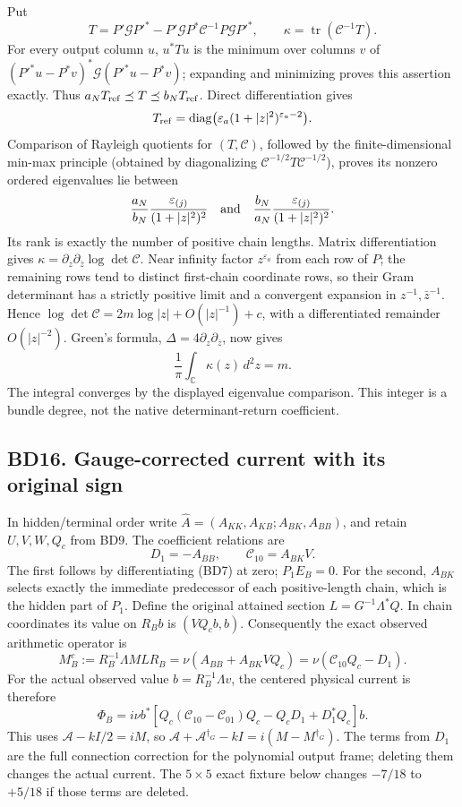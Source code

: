 \documentclass[11pt]{article}
\begin{document}
Put \[
T=P'\mathcal G P'^*-P'\mathcal G P^*\mathcal C^{-1}P\mathcal G P'^*,
\qquad \kappa=\operatorname{tr}(\mathcal C^{-1}T).
\] For every output column \(u\), \(u^*Tu\) is the minimum over columns \(v\) of \((P'^*u-P^*v)^*\mathcal G(P'^*u-P^*v)\); expanding and minimizing proves this assertion exactly. Thus \(a_NT_{\rm ref}\preceq T\preceq b_NT_{\rm ref}\). Direct differentiation gives \[
T_{\rm ref}=\operatorname{diag}\bigl(\varepsilon_a(1+|z|^2)^{\varepsilon_a-2}\bigr).
\] Comparison of Rayleigh quotients for \((T,\mathcal C)\), followed by the finite-dimensional min-max principle (obtained by diagonalizing \(\mathcal C^{-1/2}T\mathcal C^{-1/2}\)), proves its nonzero ordered eigenvalues lie between \[
\frac{a_N}{b_N}\frac{\varepsilon_{(j)}}{(1+|z|^2)^2}
\quad\hbox{and}\quad
\frac{b_N}{a_N}\frac{\varepsilon_{(j)}}{(1+|z|^2)^2}.
\] Its rank is exactly the number of positive chain lengths. Matrix differentiation gives \(\kappa=\partial_z\partial_{\bar z}\log\det\mathcal C\). Near infinity factor \(z^{\varepsilon_a}\) from each row of \(P\); the remaining rows tend to distinct first-chain coordinate rows, so their Gram determinant has a strictly positive limit and a convergent expansion in \(z^{-1},\bar z^{-1}\). Hence \(\log\det\mathcal C=2m\log|z|+O(|z|^{-1})+c\), with a differentiated remainder \(O(|z|^{-2})\). Green's formula, \(\Delta=4\partial_z\partial_{\bar z}\), now gives \[
\frac1\pi\int_{\mathbb C}\kappa(z)\,d^2z=m. \tag{BD26}
\] The integral converges by the displayed eigenvalue comparison. This integer is a bundle degree, not the native determinant-return coefficient.

\subsection{BD16. Gauge-corrected current with its original sign}\label{bd16.-gauge-corrected-current-with-its-original-sign}

In hidden/terminal order write \(\widehat A=(A_{KK},A_{KB};A_{BK},A_{BB})\), and retain \(U,V,W,Q_c\) from BD9. The coefficient relations are \[
D_1=-A_{BB},\qquad \mathcal C_{10}=A_{BK}V. \tag{BD27}
\] The first follows by differentiating (BD7) at zero; \(P_1E_B=0\). For the second, \(A_{BK}\) selects exactly the immediate predecessor of each positive-length chain, which is the hidden part of \(P_1\). Define the original attained section \(L=G^{-1}\Lambda^*Q\). In chain coordinates its value on \(R_Bb\) is \((VQ_cb,b)\). Consequently the exact observed arithmetic operator is \[
M_B^c:=R_B^{-1}\Lambda ML R_B
=\nu(A_{BB}+A_{BK}VQ_c)
=\nu(\mathcal C_{10}Q_c-D_1). \tag{BD28}
\] For the actual observed value \(b=R_B^{-1}\Lambda v\), the centered physical current is therefore \[
\Phi_B=i\nu b^*\left[
Q_c(\mathcal C_{10}-\mathcal C_{01})Q_c-Q_cD_1+D_1^*Q_c
\right]b. \tag{BD29}
\] This uses \(\mathscr A-kI/2=iM\), so \(\mathscr A+\mathscr A^{\dagger_G}-kI=i(M-M^{\dagger_G})\). The terms from \(D_1\) are the full connection correction for the polynomial output frame; deleting them changes the actual current. The \(5\times5\) exact fixture below changes \(-7/18\) to \(+5/18\) if those terms are deleted.
\end{document}
